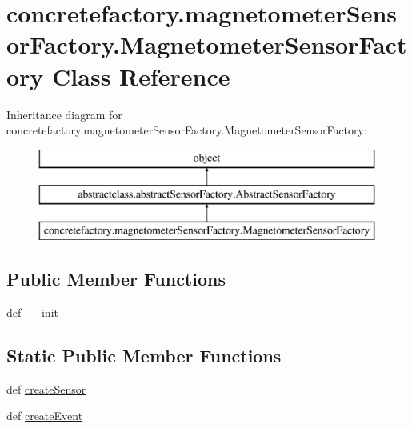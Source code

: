 \hypertarget{classconcretefactory_1_1magnetometerSensorFactory_1_1MagnetometerSensorFactory}{}\section{concretefactory.\+magnetometer\+Sensor\+Factory.\+Magnetometer\+Sensor\+Factory Class Reference}
\label{classconcretefactory_1_1magnetometerSensorFactory_1_1MagnetometerSensorFactory}
Inheritance diagram for concretefactory.\+magnetometer\+Sensor\+Factory.\+Magnetometer\+Sensor\+Factory\+:\begin{figure}[H]
\begin{center}
\leavevmode
\includegraphics[height=3.000000cm]{classconcretefactory_1_1magnetometerSensorFactory_1_1MagnetometerSensorFactory}
\end{center}
\end{figure}
\subsection*{Public Member Functions}
\begin{DoxyCompactItemize}
\item 
def \hyperlink{classconcretefactory_1_1magnetometerSensorFactory_1_1MagnetometerSensorFactory_a9659b94cc4b2cf9034f63fa98eacc5d1}{\+\_\+\+\_\+init\+\_\+\+\_\+}
\end{DoxyCompactItemize}
\subsection*{Static Public Member Functions}
\begin{DoxyCompactItemize}
\item 
def \hyperlink{classconcretefactory_1_1magnetometerSensorFactory_1_1MagnetometerSensorFactory_ab20fa7eddd0b13d22727989f72fa9cde}{create\+Sensor}
\item 
def \hyperlink{classconcretefactory_1_1magnetometerSensorFactory_1_1MagnetometerSensorFactory_a6f2ef13bedbc59a31ef3361970e19194}{create\+Event}
\end{DoxyCompactItemize}


